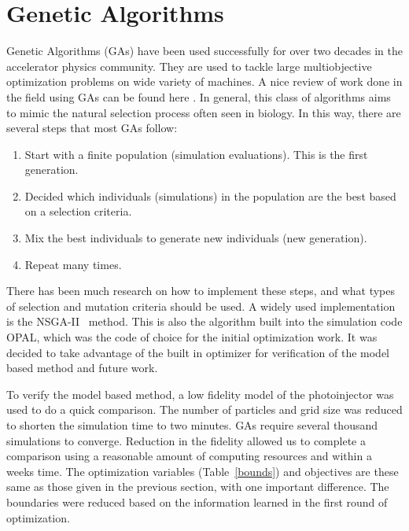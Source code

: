 \documentclass[letterpaper,  %
              ]{jacow-2_3}   %
\begin{document}
\section{Genetic Algorithms}
Genetic Algorithms (GAs) have been used successfully for over two decades
in the accelerator physics community.
They are used to tackle large multiobjective optimization problems on wide variety of machines.  
A nice review of work done in the field using GAs can be found here \cite{hofler}. 
In general, this class of algorithms aims to mimic the natural selection 
process often seen in biology. In this way, there are several
steps that most GAs follow: 
\begin{enumerate}
	\itemsep0em
	\item Start with a finite population (simulation evaluations). This is the first generation.
	\item Decided which individuals (simulations) in the population 
	are the best based on a selection criteria.
	\item Mix the best individuals to generate new individuals (new generation).
	\item Repeat many times.
\end{enumerate}

There has been much research on how to implement these steps, 
and what types of selection and mutation criteria should be used.
A widely used implementation is the \mbox{NSGA-II}~\cite{nsgaii} method.
This is also the algorithm built into the simulation code 
OPAL, which was the code of choice for the initial 
optimization work. It was decided to take advantage of the 
built in optimizer for verification of the model based 
method and future work.

To verify the model based method, a low fidelity model 
of the photoinjector was used to do a quick comparison.
The number of particles and grid size was reduced to 
shorten the simulation time to two minutes. 
GAs require several thousand simulations to converge. 
Reduction in the fidelity 
allowed us to complete a comparison using a reasonable 
amount of computing resources and within a weeks time.
The optimization variables (Table~\ref{bounds}) 
and objectives are these same as those given in the previous section, 
with one important difference. The boundaries were 
reduced based on the information learned in the first
round of optimization.
\end{document}
